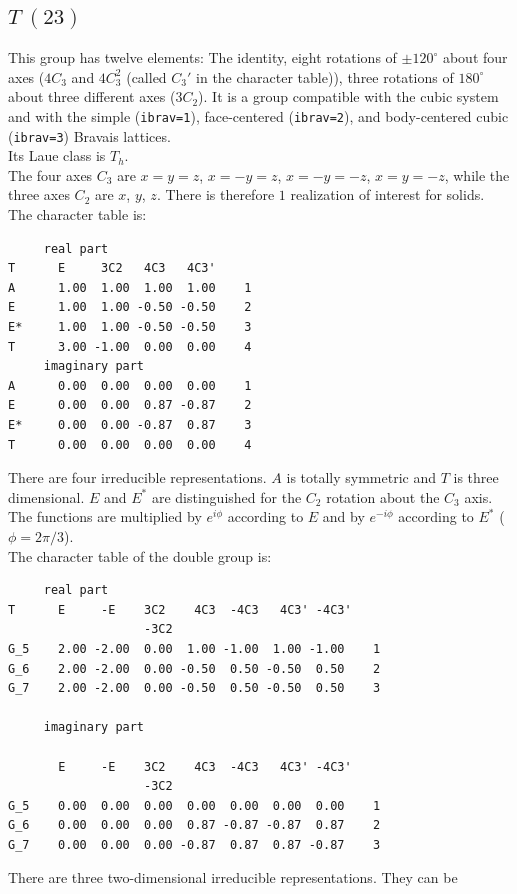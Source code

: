 \documentclass[12pt,a4paper]{article}
\begin{document}
\subsection{\color{web-blue}$T\ (23)$} 
This group has twelve elements: The identity, eight rotations of $\pm120^\circ$ 
about four axes ($4C_3$ and $4C_3^2$ (called $C_3'$ in the character
table)), three rotations of $180^\circ$ about three different axes ($3C_2$).
It is a group compatible with the cubic system and with the  
simple (\texttt{ibrav=1}), face-centered (\texttt{ibrav=2}), 
and body-centered cubic (\texttt{ibrav=3}) Bravais lattices. \\
Its Laue class is $T_{h}$. \\
The four axes $C_3$ are $x=y=z$, $x=-y=z$, $x=-y=-z$, $x=y=-z$, while
the three axes $C_2$ are $x$, $y$, $z$. There is therefore $1$
realization of interest for solids. \\
The character table is:
\begin{verbatim}
     real part
T      E     3C2   4C3   4C3' 
A      1.00  1.00  1.00  1.00    1
E      1.00  1.00 -0.50 -0.50    2
E*     1.00  1.00 -0.50 -0.50    3
T      3.00 -1.00  0.00  0.00    4
     imaginary part
A      0.00  0.00  0.00  0.00    1
E      0.00  0.00  0.87 -0.87    2
E*     0.00  0.00 -0.87  0.87    3
T      0.00  0.00  0.00  0.00    4
\end{verbatim}
There are four irreducible representations. $A$ is totally symmetric and
$T$ is three dimensional. $E$ and $E^*$ are distinguished for the $C_2$ rotation
about the $C_3$ axis. The functions are multiplied by $e^{i\phi}$ according
to $E$ and by $e^{-i\phi}$ according to $E^*$ ($\phi=2\pi/3$). \\
The character table of the double group is:
\begin{verbatim}
     real part
T      E     -E    3C2    4C3  -4C3   4C3' -4C3'
                   -3C2                         
G_5    2.00 -2.00  0.00  1.00 -1.00  1.00 -1.00    1
G_6    2.00 -2.00  0.00 -0.50  0.50 -0.50  0.50    2
G_7    2.00 -2.00  0.00 -0.50  0.50 -0.50  0.50    3

     imaginary part

       E     -E    3C2    4C3  -4C3   4C3' -4C3'
                   -3C2                         
G_5    0.00  0.00  0.00  0.00  0.00  0.00  0.00    1
G_6    0.00  0.00  0.00  0.87 -0.87 -0.87  0.87    2
G_7    0.00  0.00  0.00 -0.87  0.87  0.87 -0.87    3
\end{verbatim}
There are three two-dimensional irreducible representations. They can be
\end{document}
